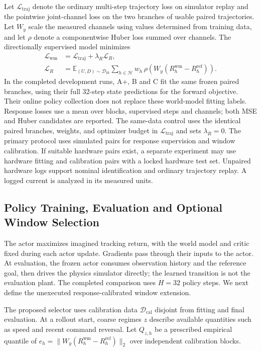\documentclass[letterpaper,10pt,conference]{ieeeconf}
\newcommand{\wm}{\mathrm{wm}}
\newcommand{\E}{\mathbb{E}}
\begin{document}
Let $\mathcal L_{\mathrm{traj}}$ denote the ordinary multi-step trajectory loss on simulator replay and the pointwise joint-channel loss on the two branches of usable paired trajectories. Let $W_y$ scale the measured channels using values determined from training data, and let $\rho$ denote a componentwise Huber loss summed over channels. The directionally supervised model minimizes
\begin{equation}\label{eq:loss}
\begin{aligned}
 \mathcal L_{\mathrm{wm}} &= \mathcal L_{\mathrm{traj}}+\lambda_R\mathcal L_R,\\
 \mathcal L_R &= \E_{(U,D)\sim\mathcal D_{\mathrm{fit}}}
 \sum_{h\in\mathcal H}w_h\,\rho\!\left(W_y(R_h^\wm-R_h^{\mathrm{ref}})\right).
\end{aligned}
\end{equation}
In the completed development runs, A+, B and C fit the same frozen paired branches, using their full 32-step state predictions for the forward objective. Their online policy collection does not replace these world-model fitting labels. Response losses use a mean over blocks, supervised steps and channels; both MSE and Huber candidates are reported. The same-data control uses the identical paired branches, weights, and optimizer budget in $\mathcal L_{\mathrm{traj}}$ and sets $\lambda_R=0$. The primary protocol uses simulated pairs for response supervision and window calibration. If suitable hardware pairs exist, a separate experiment may use hardware fitting and calibration pairs with a locked hardware test set. Unpaired hardware logs support nominal identification and ordinary trajectory replay. A logged current is analyzed in its measured units.

\subsection{Policy Training, Evaluation and Optional Window Selection}
The actor maximizes imagined tracking return, with the world model and critic fixed during each actor update. Gradients pass through their inputs to the actor. At evaluation, the frozen actor consumes observation history and the reference goal, then drives the physics simulator directly; the learned transition is not the evaluation plant. The completed comparison uses $H=32$ policy steps. We next define the unexecuted response-calibrated window extension.

The proposed selector uses calibration data $\mathcal D_{\mathrm{cal}}$ disjoint from fitting and final evaluation. At a rollout start, coarse regimes $z$ describe available quantities such as speed and recent command reversal. Let $Q_{z,h}$ be a prescribed empirical quantile of $e_h=\|W_y(R_h^\wm-R_h^{\mathrm{ref}})\|_2$ over independent calibration blocks.
\end{document}
